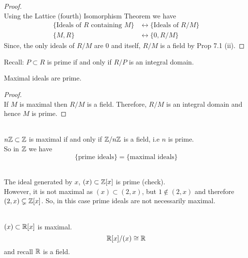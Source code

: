 \documentclass[../Main.tex]{subfiles}
\begin{document}
\begin{proof}~\\
	Using the Lattice (fourth) Isomorphism Theorem  we have
	\begin{align*}
	\{\text{Ideals of } R \text{ containing } M \} &\longleftrightarrow \{\text{Ideals of } R/M\}\\
	\{M,R\} &\longleftrightarrow \{0, R/M\}
	\end{align*}
	Since, the only ideals of $R/M$ are $0$ and itself, $R/M$ is a field by Prop 7.1 (ii).
\end{proof}
Recall: $P\subset R$ is prime if and only if $R/P$ is an integral domain.
\begin{crl}
	Maximal ideals are prime.
\end{crl}
\begin{proof}~\\
	If $M$ is maximal then $R/M$ is a field. Therefore, $R/M$ is an integral domain and hence $M$ is prime.
\end{proof}
\begin{example}~\\
	$n\mathbb{Z}\subset \mathbb{Z}$ is maximal if and only if $\mathbb{Z}/n\mathbb{Z}$ is a field, i.e $n$ is prime.\\
	So in $\mathbb{Z}$ we have
	\[\{\text{prime ideals}\} =\{\text{maximal ideals}\} \]
\end{example}
\begin{example}~\\
	The ideal generated by $x$, $(x) \subset \mathbb{Z}[x]$ is prime (check).\\
	However, it is not maximal as $(x) \subset (2,x)$, but $1\notin (2,x)$ and therefore $(2,x) \subsetneq \mathbb{Z}[x]$.
	So, in this case prime ideals are not necessarily maximal.
\end{example}
\begin{example}~\\
	$(x)\subset \mathbb{R}[x]$ is maximal.
	\[\mathbb{R}[x]/(x) \cong \mathbb{R}\]
	and recall $\mathbb{R}$ is a field.
\end{example}
\end{document}
